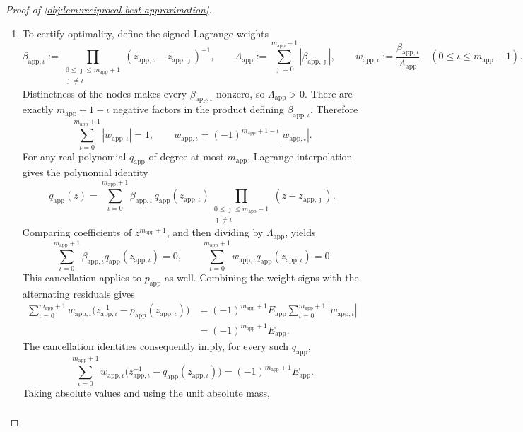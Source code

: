 \documentclass[11pt]{article}
\begin{document}
\begin{proof}[Proof of \cref{obj:lem:reciprocal-best-approximation}]
\begin{enumerate}
\item To certify optimality, define the signed Lagrange weights
\[
\beta_{\mathrm{app},\iota}:=
\prod_{\substack{0\le\jmath\le m_{\mathrm{app}}+1\\\jmath\ne\iota}}
(z_{\mathrm{app},\iota}-z_{\mathrm{app},\jmath})^{-1},
\qquad
\Lambda_{\mathrm{app}}:=
\sum_{\jmath=0}^{m_{\mathrm{app}}+1}
|\beta_{\mathrm{app},\jmath}|,
\qquad
w_{\mathrm{app},\iota}:=
\frac{\beta_{\mathrm{app},\iota}}{\Lambda_{\mathrm{app}}}
\quad(0\le\iota\le m_{\mathrm{app}}+1).
\]
Distinctness of the nodes makes every \(\beta_{\mathrm{app},\iota}\) nonzero, so \(\Lambda_{\mathrm{app}}>0\). There are exactly
\(m_{\mathrm{app}}+1-\iota\) negative factors in the product defining
\(\beta_{\mathrm{app},\iota}\). Therefore
\[
\sum_{\iota=0}^{m_{\mathrm{app}}+1}|w_{\mathrm{app},\iota}|=1,
\qquad
w_{\mathrm{app},\iota}
=
(-1)^{m_{\mathrm{app}}+1-\iota}
|w_{\mathrm{app},\iota}|.
\]
For any real polynomial \(q_{\mathrm{app}}\) of degree at most
\(m_{\mathrm{app}}\), Lagrange interpolation gives the polynomial identity
\[
q_{\mathrm{app}}(z)
=
\sum_{\iota=0}^{m_{\mathrm{app}}+1}
\beta_{\mathrm{app},\iota}\,
q_{\mathrm{app}}(z_{\mathrm{app},\iota})
\prod_{\substack{0\le\jmath\le m_{\mathrm{app}}+1\\\jmath\ne\iota}}
(z-z_{\mathrm{app},\jmath}).
\]
Comparing coefficients of \(z^{m_{\mathrm{app}}+1}\), and then dividing by
\(\Lambda_{\mathrm{app}}\), yields
\[
\sum_{\iota=0}^{m_{\mathrm{app}}+1}
\beta_{\mathrm{app},\iota}
q_{\mathrm{app}}(z_{\mathrm{app},\iota})=0,
\qquad
\sum_{\iota=0}^{m_{\mathrm{app}}+1}
w_{\mathrm{app},\iota}
q_{\mathrm{app}}(z_{\mathrm{app},\iota})=0.
\]
This cancellation applies to \(p_{\mathrm{app}}\) as well. Combining the weight signs with the alternating residuals gives
\[
\begin{aligned}
\sum_{\iota=0}^{m_{\mathrm{app}}+1}
w_{\mathrm{app},\iota}
\bigl(z_{\mathrm{app},\iota}^{-1}
-p_{\mathrm{app}}(z_{\mathrm{app},\iota})\bigr)
&=
(-1)^{m_{\mathrm{app}}+1}E_{\mathrm{app}}
\sum_{\iota=0}^{m_{\mathrm{app}}+1}
|w_{\mathrm{app},\iota}|\\
&=(-1)^{m_{\mathrm{app}}+1}E_{\mathrm{app}}.
\end{aligned}
\]
The cancellation identities consequently imply, for every such
\(q_{\mathrm{app}}\),
\[
\sum_{\iota=0}^{m_{\mathrm{app}}+1}
w_{\mathrm{app},\iota}
\bigl(z_{\mathrm{app},\iota}^{-1}
-q_{\mathrm{app}}(z_{\mathrm{app},\iota})\bigr)
=
(-1)^{m_{\mathrm{app}}+1}E_{\mathrm{app}}.
\]
Taking absolute values and using the unit absolute mass,
\[
\begin{aligned}

\end{aligned}\]
\end{enumerate}
\end{proof}
\end{document}
